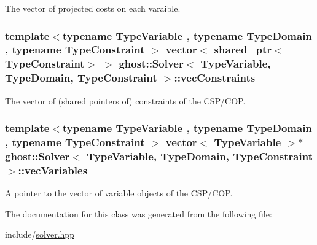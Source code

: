 The vector of projected costs on each varaible. 

\hypertarget{classghost_1_1Solver_a170746edcfb777b12978444c2ab3962e}{
\subsubsection[{vec\-Constraints}]{\setlength{\rightskip}{0pt plus 5cm}template$<$typename Type\-Variable , typename Type\-Domain , typename Type\-Constraint $>$ vector$<$ shared\-\_\-ptr$<$Type\-Constraint$>$ $>$ {\bf ghost\-::\-Solver}$<$ Type\-Variable, Type\-Domain, Type\-Constraint $>$\-::vec\-Constraints\hspace{0.3cm}{\ttfamily [private]}}}\label{classghost_1_1Solver_a170746edcfb777b12978444c2ab3962e}


The vector of (shared pointers of) constraints of the C\-S\-P/\-C\-O\-P. 

\hypertarget{classghost_1_1Solver_a2d033a454234b2277aabdcc4d89eaba2}{
\subsubsection[{vec\-Variables}]{\setlength{\rightskip}{0pt plus 5cm}template$<$typename Type\-Variable , typename Type\-Domain , typename Type\-Constraint $>$ vector$<$ Type\-Variable $>$$\ast$ {\bf ghost\-::\-Solver}$<$ Type\-Variable, Type\-Domain, Type\-Constraint $>$\-::vec\-Variables\hspace{0.3cm}{\ttfamily [private]}}}\label{classghost_1_1Solver_a2d033a454234b2277aabdcc4d89eaba2}


A pointer to the vector of variable objects of the C\-S\-P/\-C\-O\-P. 



The documentation for this class was generated from the following file\-:\begin{DoxyCompactItemize}
\item 
include/\hyperlink{solver_8hpp}{solver.\-hpp}\end{DoxyCompactItemize}
